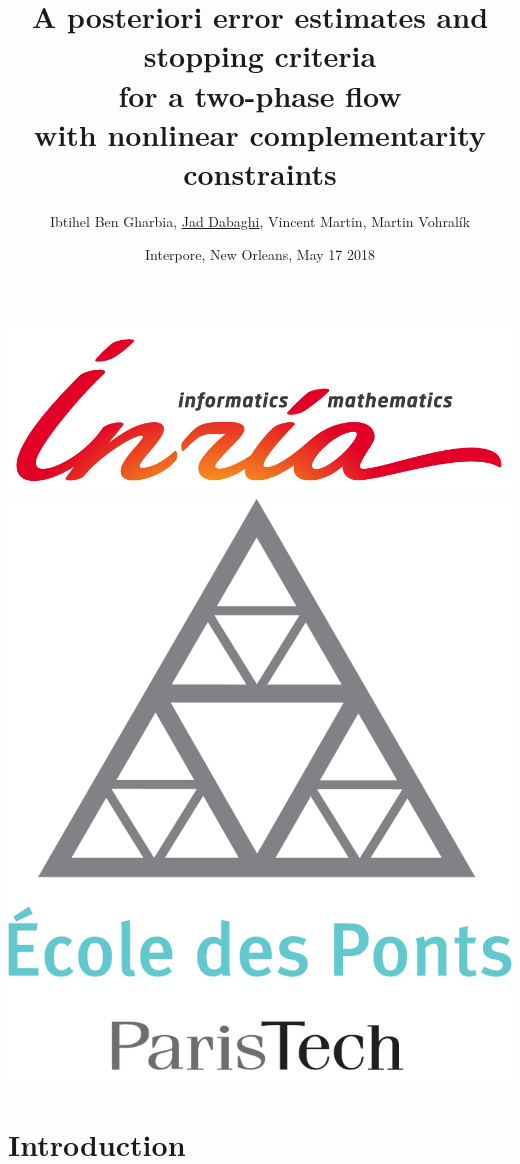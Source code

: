 \documentclass[10 pt]{beamer}
\title[Interpore 2018]{A posteriori error estimates and stopping criteria\\ for a two-phase flow\\ with nonlinear complementarity constraints}
\author[Jad Dabaghi]
{Ibtihel Ben Gharbia, \underline{Jad Dabaghi}, Vincent Martin, Martin Vohral\'ik}
\institute[]{Inria Paris \& Université Paris-Est}
\date{Interpore, New Orleans, May 17 2018}
\begin{document}
\begin{frame}
\maketitle
\includegraphics[scale=0.3]{INRIA-SCIENTIFIQUE-UK-RVB}
\hfill \includegraphics[scale=0.08]{Logo_ponts_paristech}

\end{frame}










\setcounter{tocdepth}{4}
\section{Introduction}
\end{document}
